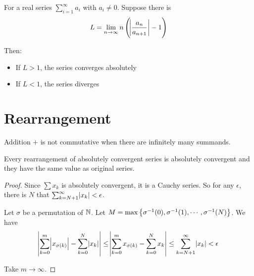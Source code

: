 \begin{theorem}
    For a real series $\sum_{i=1}^\infty a_i$ with $a_i \neq 0$. Suppose there is 
    \begin{equation}
        L = \lim_{n \rightarrow \infty} n \left( \abs{\frac{a_n}{a_{n+1}}} - 1 \right)
    \end{equation}
    
    Then:
    \begin{itemize}
        \item If $L > 1$, the series converges absolutely
        \item If $L < 1$, the series diverges
    \end{itemize}
\end{theorem}




\section{Rearrangement}

Addition $+$ is not commutative when there are infinitely many summands.

\begin{theorem}
    Every rearrangement of absolutely convergent series is absolutely convergent and they have the same value as original series.    
\end{theorem}
\begin{proof}
    Since $\sum x_k$ is absolutely convergent, it is a Cauchy series. So for any $\epsilon$, there is $N$ that $\sum_{k=N+1}^\infty \abs{x_k} < \epsilon$.
    
    Let $\sigma$ be a permutation of $\mathbb{N}$. Let $M = \max \set{ {\sigma}^{-1} (0),  {\sigma}^{-1} (1), \cdots,  {\sigma}^{-1} (N) }$. We have
    \begin{equation}
        \abs{\sum_{k=0}^m \abs{x_{\sigma (k)}} - \sum_{k=0}^N \abs{x_k} } \leq \abs{\sum_{k=0}^m x_{\sigma (k)} - \sum_{k=0}^N x_k } \leq \sum_{k=N+1}^\infty \abs{x_k} < \epsilon
    \end{equation}
    
    Take $m \rightarrow \infty$.
\end{proof}

